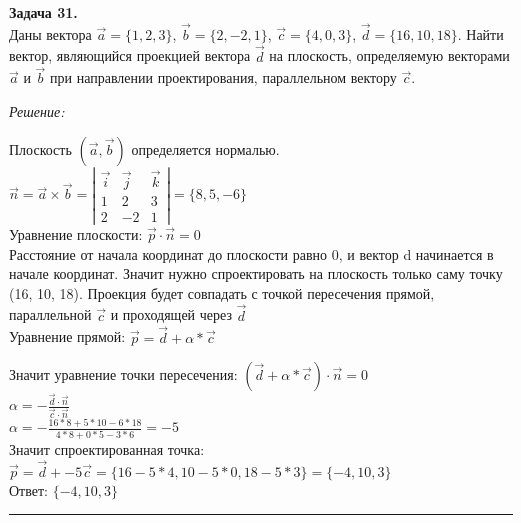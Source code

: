 \documentclass[a4paper, 12pt]{article}
\newenvironment{problem}[2][Задача]
    { \begin{mdframed}[backgroundcolor=gray!10] \textbf{#1 #2.} \\}
    {  \end{mdframed}}
\newenvironment{solution}
    {\textit{Решение: }}
    {\noindent\rule{7in}{1.5pt}}
\begin{document}
\begin{problem}{31}
Даны вектора $\vec{a}=\{1,2,3\}$, $\vec{b}=\{2,-2,1\}$, $\vec{c}=\{4,0,3\}$, $\vec{d}=\{16,10,18\}$.
Найти вектор, являющийся проекцией вектора $\vec d$ на плоскость, определяемую векторами
$\vec a$ и $\vec b$ при направлении проектирования, параллельном вектору $\vec c$.
\end{problem}
\begin{solution}

Плоскость $(\overrightarrow{a}, \overrightarrow{b})$ определяется нормалью. \\
$
\overrightarrow{n} =
\overrightarrow{a} \times \overrightarrow{b} =
\left|
  \begin{array}{rrr}
    \overrightarrow{i} & \overrightarrow{j} & \overrightarrow{k} \\
    1 &  2 & 3 \\
    2 & -2 & 1
  \end{array}
\right|
= \{8, 5, -6\}
$
\\ Уравнение плоскости: $\overrightarrow{p} \cdot \overrightarrow{n} = 0$ \\
Расстояние от начала координат до плоскости равно 0, и вектор d начинается в начале координат.
Значит нужно спроектировать на плоскость только саму точку (16, 10, 18).
Проекция будет совпадать с точкой пересечения прямой, параллельной $\overrightarrow{c}$ и проходящей через $\overrightarrow{d}$
\\ Уравнение прямой: $\overrightarrow{p} = \overrightarrow{d} + \alpha * \overrightarrow{c}$

Значит уравнение точки пересечения:
$(\overrightarrow{d} + \alpha * \overrightarrow{c}) \cdot \overrightarrow{n} = 0$ \\
$\alpha = -\frac{\overrightarrow{d} \cdot \overrightarrow{n}}{\overrightarrow{c} \cdot \overrightarrow{n}}$ \\
$\alpha = -\frac{16 * 8 + 5 * 10 - 6 * 18}{4 * 8 + 0 * 5 - 3 * 6} = -5$ \\

Значит спроектированная точка:
$
\overrightarrow{p} =
\overrightarrow{d} + -5\overrightarrow{c} =
\{16 - 5 * 4, 10 - 5 * 0, 18 - 5 * 3\} = \{-4, 10, 3\}
$ \\
Ответ: $\{-4, 10, 3\}$

\end{solution}

\end{document}
